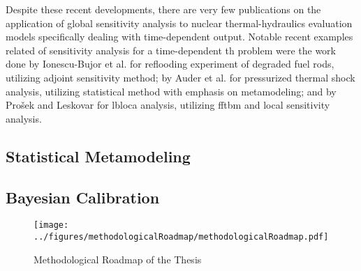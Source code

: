 Despite these recent developments, 
there are very few publications on the application of global sensitivity analysis to nuclear thermal-hydraulics evaluation models specifically dealing with time-dependent output.
Notable recent examples related of sensitivity analysis for a time-dependent \gls{th} problem were the work done by Ionescu-Bujor et al. \cite{Ionescu-Bujor2005} 
for reflooding experiment of degraded fuel rods, utilizing adjoint sensitivity method; 
by Auder et al. \cite{Auder2012} for pressurized thermal shock analysis, 
utilizing statistical method with emphasis on metamodeling; 
and by Prošek and Leskovar \cite{Prosek2015} for \gls{lbloca} analysis, 
utilizing \gls{fftbm} and local sensitivity analysis.

\subsection{Statistical Metamodeling}

\subsection{Bayesian Calibration}

\begin{sidewaysfigure}
	\centering
	\texttt{[image: ../figures/methodologicalRoadmap/methodologicalRoadmap.pdf]}
	\caption{Methodological Roadmap of the Thesis}
	\label{fig:methodological_roadmap}
\end{sidewaysfigure}